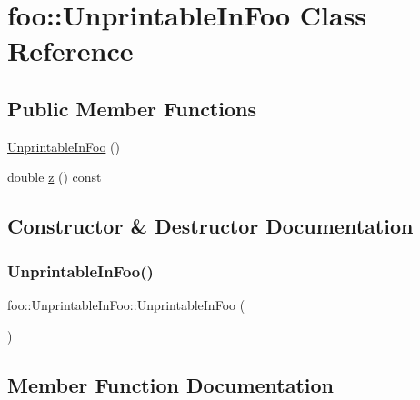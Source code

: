 \hypertarget{classfoo_1_1UnprintableInFoo}{}\section{foo\+::Unprintable\+In\+Foo Class Reference}
\label{classfoo_1_1UnprintableInFoo}
\subsection*{Public Member Functions}
\begin{DoxyCompactItemize}
\item 
\mbox{\hyperlink{classfoo_1_1UnprintableInFoo_a120cd61575729a26a96690c8a58e41f8}{Unprintable\+In\+Foo}} ()
\item 
double \mbox{\hyperlink{classfoo_1_1UnprintableInFoo_a3dc8c8e90906bb6f3376474d545e488c}{z}} () const
\end{DoxyCompactItemize}


\subsection{Constructor \& Destructor Documentation}
\mbox{\label{classfoo_1_1UnprintableInFoo_a120cd61575729a26a96690c8a58e41f8}} 
\subsubsection{\texorpdfstring{UnprintableInFoo()}{UnprintableInFoo()}}
{\footnotesize\ttfamily foo\+::\+Unprintable\+In\+Foo\+::\+Unprintable\+In\+Foo (\begin{DoxyParamCaption}{ }\end{DoxyParamCaption})\hspace{0.3cm}{\ttfamily [inline]}}



\subsection{Member Function Documentation}
\mbox{\label{classfoo_1_1UnprintableInFoo_a3dc8c8e90906bb6f3376474d545e488c}} 
